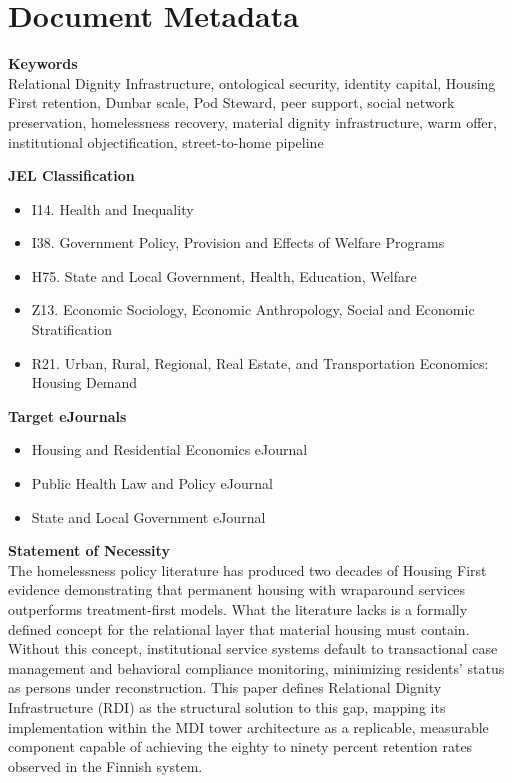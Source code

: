 \documentclass[12pt, letterpaper]{article}
\begin{document}

\newpage
\section*{Document Metadata}

{\footnotesize{}

\noindent\textbf{Keywords}\\[1pt]
Relational Dignity Infrastructure, ontological security, identity capital, Housing First retention, Dunbar scale, Pod Steward, peer support, social network preservation, homelessness recovery, material dignity infrastructure, warm offer, institutional objectification, street-to-home pipeline

\vspace{8pt}
\noindent\textbf{JEL Classification}
\begin{itemize}[nosep, before={\vspace{-8pt}}, leftmargin=2em]
    \item I14. Health and Inequality
    \item I38. Government Policy, Provision and Effects of Welfare Programs
    \item H75. State and Local Government, Health, Education, Welfare
    \item Z13. Economic Sociology, Economic Anthropology, Social and Economic Stratification
    \item R21. Urban, Rural, Regional, Real Estate, and Transportation Economics: Housing Demand
\end{itemize}

\vspace{8pt}
\noindent\textbf{Target eJournals}
\begin{itemize}[nosep, before={\vspace{-8pt}}, leftmargin=2em]
    \item Housing and Residential Economics eJournal
    \item Public Health Law and Policy eJournal
    \item State and Local Government eJournal
\end{itemize}

\vspace{8pt}
\noindent\textbf{Statement of Necessity}\\[1pt]
The homelessness policy literature has produced two decades of Housing First evidence demonstrating that permanent housing with wraparound services outperforms treatment-first models. What the literature lacks is a formally defined concept for the relational layer that material housing must contain. Without this concept, institutional service systems default to transactional case management and behavioral compliance monitoring, minimizing residents' status as persons under reconstruction. This paper defines Relational Dignity Infrastructure (RDI) as the structural solution to this gap, mapping its implementation within the MDI tower architecture as a replicable, measurable component capable of achieving the eighty to ninety percent retention rates observed in the Finnish system.



}
\end{document}

